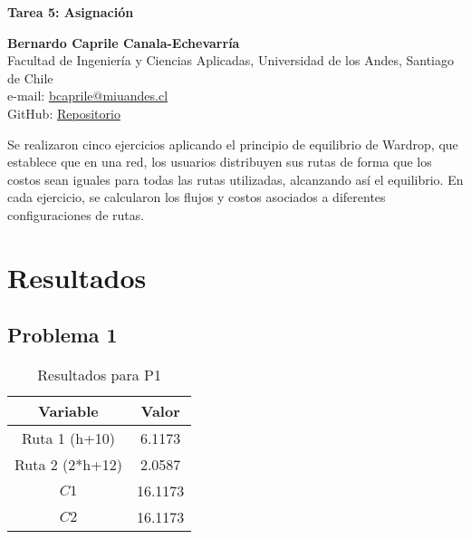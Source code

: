 \documentclass[letterpaper,12pt]{article}
\begin{document}
\begin{titlepage}
    \begin{center}
        
    
    \vspace*{1cm}


    \textbf{\Large Tarea 5: Asignación}
  
    \vspace{1cm}
    
    \textbf{Bernardo Caprile Canala-Echevarría}\\
    Facultad de Ingeniería y Ciencias Aplicadas, Universidad de los Andes, Santiago de Chile\\
    e-mail: \href{mailto:bcaprile@miuandes.cl}{bcaprile@miuandes.cl}\\
    GitHub: \href{https://github.com/LukasWolff2002/TAREA_4_AUTITOS}{Repositorio}
    \vspace{2cm}
    
    
    \end{center}
    Se realizaron cinco ejercicios aplicando el principio de equilibrio de Wardrop, que establece que en una red, los usuarios distribuyen sus rutas de forma que los costos sean iguales para todas las rutas utilizadas, alcanzando así el equilibrio. En cada ejercicio, se calcularon los flujos y costos asociados a diferentes configuraciones de rutas.
    
\end{titlepage}

\newpage
\section{Resultados}
\subsection{Problema 1}
\begin{table}[h!]
    \centering
    \begin{tabular}{|c|c|}
    \hline
    \textbf{Variable} & \textbf{Valor} \\ \hline
    Ruta 1 (h+10)           & 6.1173         \\ \hline
    Ruta 2 (2*h+12)           & 2.0587         \\ \hline
    $C1$              & 16.1173        \\ \hline
    $C2$              & 16.1173        \\ \hline
    \end{tabular}
    \caption{Resultados para P1}
\end{table}
    
\end{document}
